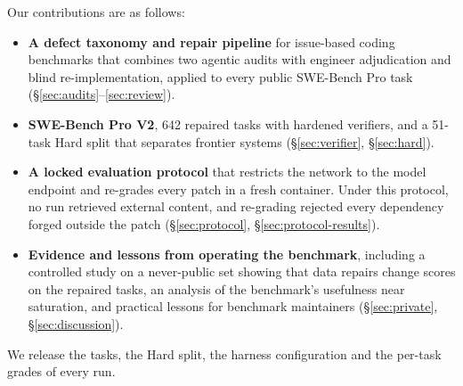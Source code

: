 Our contributions are as follows:
\begin{itemize}\setlength\itemsep{0pt}
\item \textbf{A defect taxonomy and repair pipeline} for issue-based coding benchmarks that combines two agentic audits with engineer adjudication and blind re-implementation, applied to every public SWE-Bench Pro task (\S\ref{sec:audits}--\ref{sec:review}).
\item \textbf{SWE-Bench Pro V2}, 642 repaired tasks with hardened verifiers, and a 51-task Hard split that separates frontier systems (\S\ref{sec:verifier}, \S\ref{sec:hard}).
\item \textbf{A locked evaluation protocol} that restricts the network to the model endpoint and re-grades every patch in a fresh container. Under this protocol, no run retrieved external content, and re-grading rejected every dependency forged outside the patch (\S\ref{sec:protocol}, \S\ref{sec:protocol-results}).
\item \textbf{Evidence and lessons from operating the benchmark}, including a controlled study on a never-public set showing that data repairs change scores on the repaired tasks, an analysis of the benchmark's usefulness near saturation, and practical lessons for benchmark maintainers (\S\ref{sec:private}, \S\ref{sec:discussion}). 
\end{itemize}
We release the tasks, the Hard split, the harness configuration and the per-task grades of every run.


